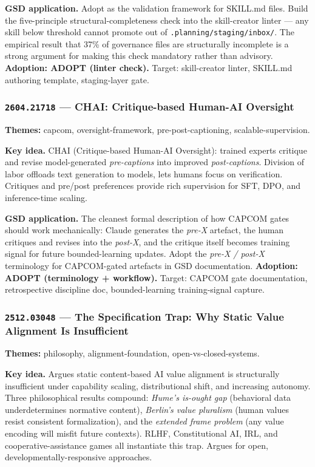 \documentclass[11pt,letterpaper]{article}
\newcommand{\arxivid}[1]{\texttt{\textcolor{accent}{#1}}}
\newcommand{\paperhead}[2]{\noindent\textbf{\sffamily\textcolor{secondary}{#1}} \textemdash{} #2}
\begin{document}
\textbf{GSD application.} Adopt as the validation framework for SKILL.md files. Build the five-principle structural-completeness check into the skill-creator linter --- any skill below threshold cannot promote out of \texttt{.planning/staging/inbox/}. The empirical result that 37\% of governance files are structurally incomplete is a strong argument for making this check mandatory rather than advisory. \textbf{Adoption: ADOPT (linter check).} Target: skill-creator linter, SKILL.md authoring template, staging-layer gate.

\subsubsection{\arxivid{2604.21718} --- CHAI: Critique-based Human-AI Oversight}

\paperhead{Themes:}{capcom, oversight-framework, pre-post-captioning, scalable-supervision.}

\textbf{Key idea.} CHAI (Critique-based Human-AI Oversight): trained experts critique and revise model-generated \textit{pre-captions} into improved \textit{post-captions}. Division of labor offloads text generation to models, lets humans focus on verification. Critiques and pre/post preferences provide rich supervision for SFT, DPO, and inference-time scaling.

\textbf{GSD application.} The cleanest formal description of how CAPCOM gates should work mechanically: Claude generates the \textit{pre-X} artefact, the human critiques and revises into the \textit{post-X}, and the critique itself becomes training signal for future bounded-learning updates. Adopt the \textit{pre-X / post-X} terminology for CAPCOM-gated artefacts in GSD documentation. \textbf{Adoption: ADOPT (terminology + workflow).} Target: CAPCOM gate documentation, retrospective discipline doc, bounded-learning training-signal capture.

\subsubsection{\arxivid{2512.03048} --- The Specification Trap: Why Static Value Alignment Is Insufficient}

\paperhead{Themes:}{philosophy, alignment-foundation, open-vs-closed-systems.}

\textbf{Key idea.} Argues static content-based AI value alignment is structurally insufficient under capability scaling, distributional shift, and increasing autonomy. Three philosophical results compound: \textit{Hume's is-ought gap} (behavioral data underdetermines normative content), \textit{Berlin's value pluralism} (human values resist consistent formalization), and the \textit{extended frame problem} (any value encoding will misfit future contexts). RLHF, Constitutional AI, IRL, and cooperative-assistance games all instantiate this trap. Argues for open, developmentally-responsive approaches.
\end{document}

